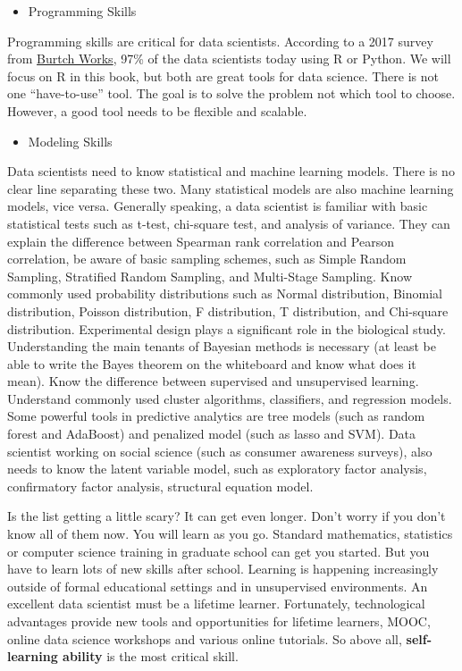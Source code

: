 \documentclass[
]{article}
\providecommand{\tightlist}{%
  \setlength{\itemsep}{0pt}\setlength{\parskip}{0pt}}
\begin{document}
\begin{itemize}
\tightlist
\item
  Programming Skills
\end{itemize}

Programming skills are critical for data scientists. According to a 2017
survey from
\href{http://www.burtchworks.com/2017/06/19/2017-sas-r-python-flash-survey-results/}{Burtch
Works}, 97\% of the data scientists today using R or Python. We will
focus on R in this book, but both are great tools for data science.
There is not one ``have-to-use'' tool. The goal is to solve the problem
not which tool to choose. However, a good tool needs to be flexible and
scalable.

\begin{itemize}
\tightlist
\item
  Modeling Skills
\end{itemize}

Data scientists need to know statistical and machine learning models.
There is no clear line separating these two. Many statistical models are
also machine learning models, vice versa. Generally speaking, a data
scientist is familiar with basic statistical tests such as t-test,
chi-square test, and analysis of variance. They can explain the
difference between Spearman rank correlation and Pearson correlation, be
aware of basic sampling schemes, such as Simple Random Sampling,
Stratified Random Sampling, and Multi-Stage Sampling. Know commonly used
probability distributions such as Normal distribution, Binomial
distribution, Poisson distribution, F distribution, T distribution, and
Chi-square distribution. Experimental design plays a significant role in
the biological study. Understanding the main tenants of Bayesian methods
is necessary (at least be able to write the Bayes theorem on the
whiteboard and know what does it mean). Know the difference between
supervised and unsupervised learning. Understand commonly used cluster
algorithms, classifiers, and regression models. Some powerful tools in
predictive analytics are tree models (such as random forest and
AdaBoost) and penalized model (such as lasso and SVM). Data scientist
working on social science (such as consumer awareness surveys), also
needs to know the latent variable model, such as exploratory factor
analysis, confirmatory factor analysis, structural equation model.

Is the list getting a little scary? It can get even longer. Don't worry
if you don't know all of them now. You will learn as you go. Standard
mathematics, statistics or computer science training in graduate school
can get you started. But you have to learn lots of new skills after
school. Learning is happening increasingly outside of formal educational
settings and in unsupervised environments. An excellent data scientist
must be a lifetime learner. Fortunately, technological advantages
provide new tools and opportunities for lifetime learners, MOOC, online
data science workshops and various online tutorials. So above all,
\textbf{self-learning ability} is the most critical skill.
\end{document}
